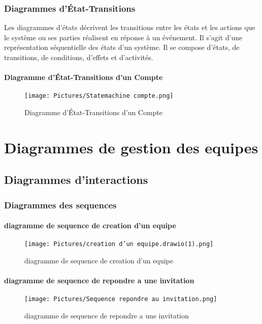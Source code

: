 \documentclass[11pt,fleqn]{book} %
\begin{document}
\subsection{ Diagrammes d’État-Transitions}
Les diagrammes d'états décrivent les transitions entre les états et les actions que le
système ou ses parties réalisent en réponse à un événement.
Il s'agit d'une représentation séquentielle des états d'un système. Il se compose d’états,
de transitions, de conditions, d’effets et d’activités.
\subsubsection{Diagramme d’État-Transitions d’un Compte}
\begin{figure}[h]
    \centering
    \texttt{[image: Pictures/Statemachine compte.png]}
    \caption{Diagramme d’État-Transitions d’un Compte}
    \label{fig:pca}
\end{figure}
\chapter{Diagrammes de gestion des equipes}
\section{Diagrammes d'interactions}
\subsection{Diagrammes des sequences}
\subsubsection{diagramme de sequence de creation d'un equipe}
\begin{figure}[h]
    \centering
    \texttt{[image: Pictures/creation d'un equipe.drawio(1).png]}
    \caption{diagramme de sequence de creation d'un equipe}
    \label{fig:pca}
\end{figure}
\newpage
\subsubsection{diagramme de sequence de repondre a une invitation}
\begin{figure}[h]
    \centering
    \texttt{[image: Pictures/Sequence repondre au invitation.png]}
    \caption{diagramme de sequence de repondre a une invitation}
    \label{fig:pca}
\end{figure}
\newpage
\end{document}
